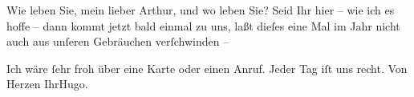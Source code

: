 \pstart
           Wie leben Sie, mein lieber Arthur, und wo leben Sie? Seid Ihr hier – wie ich es hoffe
               – dann kommt jetzt bald einmal zu uns, laßt dieſes eine Mal im Jahr nicht auch aus
               unſeren Gebräuchen verſchwinden –\pend
           
\pstart
           Ich wäre{ }ſehr froh über eine Karte oder einen Anruf. Jeder Tag iſt uns recht.\pend
           \pstart Von Herzen Ihr\spacefill\mbox{Hugo.}\pend{}\endnumbering{}  \newcommand{\dateiname}{L02074}\newcommand{\titel}{Hugo von Hofmannsthal an Arthur Schnitzler, 12. 6. 1912}\newcommand{\editorInnen}{Martin Anton Müller und Gerd-Hermann Susen}
